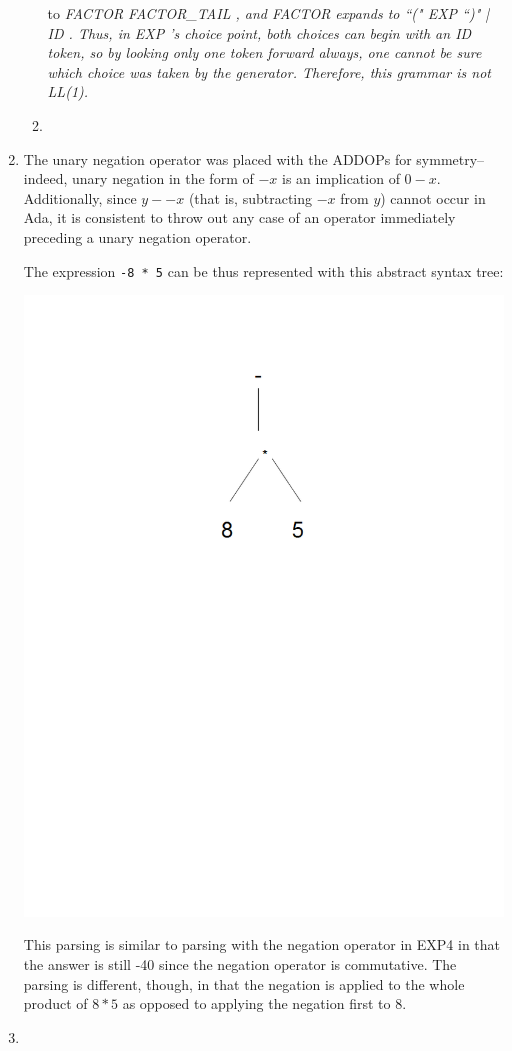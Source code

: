 \documentclass[landscape]{report}
\begin{document}
\begin{enumerate}
\begin{enumerate}
        to \em FACTOR FACTOR\_TAIL \em, and \em FACTOR \em expands to \em ``("
        EXP ``)" | ID \em. Thus, in \em EXP \em's choice point, both choices
        can begin with an \em ID \em token, so by looking only one token
        forward always, one cannot be sure which choice was taken by the
        generator. Therefore, this grammar is not LL(1).
      \item %
        
    \end{enumerate}
    \item %
      The unary negation operator was placed with the ADDOPs for symmetry--
      indeed, unary negation in the form of $-x$ is an implication of $0-x$.
      Additionally, since $y--x$ (that is, subtracting $-x$ from $y$) cannot
      occur in Ada, it is consistent to throw out any case of an operator
      immediately preceding a unary negation operator.
      
      The expression \lstinline{-8 * 5} can be thus represented with this
      abstract syntax tree:
      
      \includegraphics{img/prob5.png}
      
      This parsing is similar to parsing with the negation operator in EXP4 in
      that the answer is still -40 since the negation operator is commutative.
      The parsing is different, though, in that the negation is applied to the
      whole product of $8 * 5$ as opposed to applying the negation first to 8.
    \item %
      
  \end{enumerate}
\end{document}
